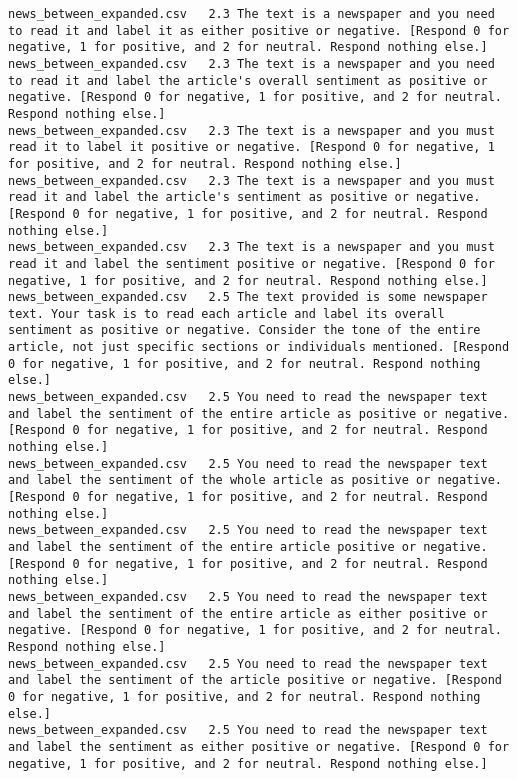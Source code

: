 \begin{lstlisting}[label=lst:promptvariants]
news_between_expanded.csv	2.3	The text is a newspaper and you need to read it and label it as either positive or negative. [Respond 0 for negative, 1 for positive, and 2 for neutral. Respond nothing else.]
news_between_expanded.csv	2.3	The text is a newspaper and you need to read it and label the article's overall sentiment as positive or negative. [Respond 0 for negative, 1 for positive, and 2 for neutral. Respond nothing else.]
news_between_expanded.csv	2.3	The text is a newspaper and you must read it to label it positive or negative. [Respond 0 for negative, 1 for positive, and 2 for neutral. Respond nothing else.]
news_between_expanded.csv	2.3	The text is a newspaper and you must read it and label the article's sentiment as positive or negative. [Respond 0 for negative, 1 for positive, and 2 for neutral. Respond nothing else.]
news_between_expanded.csv	2.3	The text is a newspaper and you must read it and label the sentiment positive or negative. [Respond 0 for negative, 1 for positive, and 2 for neutral. Respond nothing else.]
news_between_expanded.csv	2.5	The text provided is some newspaper text. Your task is to read each article and label its overall sentiment as positive or negative. Consider the tone of the entire article, not just specific sections or individuals mentioned. [Respond 0 for negative, 1 for positive, and 2 for neutral. Respond nothing else.]
news_between_expanded.csv	2.5	You need to read the newspaper text and label the sentiment of the entire article as positive or negative. [Respond 0 for negative, 1 for positive, and 2 for neutral. Respond nothing else.]
news_between_expanded.csv	2.5	You need to read the newspaper text and label the sentiment of the whole article as positive or negative. [Respond 0 for negative, 1 for positive, and 2 for neutral. Respond nothing else.]
news_between_expanded.csv	2.5	You need to read the newspaper text and label the sentiment of the entire article positive or negative. [Respond 0 for negative, 1 for positive, and 2 for neutral. Respond nothing else.]
news_between_expanded.csv	2.5	You need to read the newspaper text and label the sentiment of the entire article as either positive or negative. [Respond 0 for negative, 1 for positive, and 2 for neutral. Respond nothing else.]
news_between_expanded.csv	2.5	You need to read the newspaper text and label the sentiment of the article positive or negative. [Respond 0 for negative, 1 for positive, and 2 for neutral. Respond nothing else.]
news_between_expanded.csv	2.5	You need to read the newspaper text and label the sentiment as either positive or negative. [Respond 0 for negative, 1 for positive, and 2 for neutral. Respond nothing else.]

\end{lstlisting}
